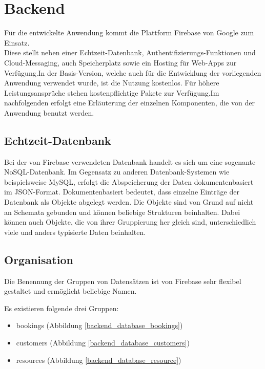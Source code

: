 \chapter{Backend}
Für die entwickelte Anwendung kommt die Plattform \glqq Firebase\grqq{} von Google zum Einsatz.
\\
Diese stellt neben einer Echtzeit-Datenbank, Authentifizierungs-Funktionen und Cloud-Messaging, auch Speicherplatz sowie ein Hosting für Web-Apps zur Verfügung.In der Basis-Version, welche auch für die Entwicklung der vorliegenden Anwendung verwendet wurde, ist die Nutzung kostenlos. Für höhere Leistungsansprüche stehen kostenpflichtige Pakete zur Verfügung.Im nachfolgenden erfolgt eine Erläuterung der einzelnen Komponenten, die von der Anwendung benutzt werden.

\section{Echtzeit-Datenbank}
Bei der von Firebase verwendeten Datenbank handelt es sich um eine sogenante NoSQL-Datenbank. Im Gegensatz zu anderen Datenbank-Systemen wie beispielsweise MySQL, erfolgt die Abspeicherung der Daten dokumentenbasiert im JSON-Format.
Dokumentenbasiert bedeutet, dass einzelne Einträge der Datenbank als Objekte abgelegt werden. Die Objekte sind von Grund auf nicht an Schemata gebunden und können beliebige Strukturen beinhalten.
Dabei können auch Objekte, die von ihrer Gruppierung her gleich sind, unterschiedlich viele und anders typisierte Daten beinhalten.\\

\section{Organisation}
Die Benennung der Gruppen von Datensätzen ist von Firebase sehr flexibel gestaltet und ermöglicht beliebige Namen.

Es existieren folgende drei Gruppen:
\begin{itemize}
\item bookings (Abbildung \ref{backend_database_bookings})
\item customers (Abbildung \ref{backend_database_customers})
\item resources (Abbildung \ref{backend_database_resource})
\end{itemize}

